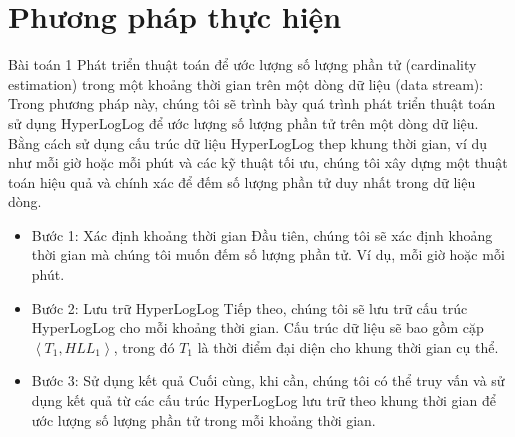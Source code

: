 \documentclass[10pt]{beamer}
\begin{document}
\section{Phương pháp thực hiện}
\begin{frame}[fragile]{Bài toán 1}
Phát triển thuật toán để ước lượng số lượng phần tử (cardinality estimation) trong 
một khoảng thời gian trên một dòng dữ liệu (data stream): Trong phương pháp này, 
chúng tôi sẽ trình bày quá trình phát triển thuật toán sử dụng HyperLogLog để 
ước lượng số lượng phần tử trên một dòng dữ liệu. Bằng cách sử dụng cấu trúc dữ liệu 
HyperLogLog thep khung thời gian, ví dụ như mỗi giờ hoặc mỗi phút và các kỹ thuật 
tối ưu, chúng tôi xây dựng một thuật toán hiệu quả và chính xác để đếm số lượng 
phần tử duy nhất trong dữ liệu dòng.
\begin{itemize}
  \item Bước 1: Xác định khoảng thời gian
  Đầu tiên, chúng tôi sẽ xác định khoảng thời gian mà chúng tôi muốn đếm số lượng 
  phần tử. Ví dụ, mỗi giờ hoặc mỗi phút.
  \item Bước 2: Lưu trữ HyperLogLog
  Tiếp theo, chúng tôi sẽ lưu trữ cấu trúc HyperLogLog cho mỗi khoảng thời gian. 
  Cấu trúc dữ liệu sẽ bao gồm cặp $\left< T_1, HLL_1\right>$, trong đó $T_1$ là 
  thời điểm đại diện cho khung thời gian cụ thể.
  \item Bước 3: Sử dụng kết quả
  Cuối cùng, khi cần, chúng tôi có thể truy vấn và sử dụng kết quả từ các cấu trúc 
  HyperLogLog lưu trữ theo khung thời gian để ước lượng số lượng phần tử trong 
  mỗi khoảng thời gian.
\end{itemize}
\end{frame}
\end{document}
